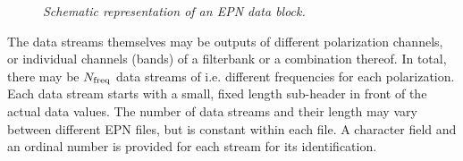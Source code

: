 \documentclass[11pt]{article}
\begin{document}
\begin{figure}[hbt]
\small
\begin{center}
\begin{minipage}{3.8cm}
\end{minipage}
\end{center}
\caption{\sl Schematic representation of an EPN data block.}
\label{epnblock}
\end{figure}

The data streams themselves may be outputs of different
polarization channels, or individual channels (bands) of a filterbank
or a combination thereof. In total, there may be $N_{\rm freq}$ data
streams of i.e. different frequencies for each polarization.  Each
data stream starts with a small, fixed length sub-header in front of
the actual data values.  The number of data streams and their length may
vary between different EPN files, but is constant within each file.  A
character field and an ordinal number is provided for each stream for
its identification. 
 
\end{document}
